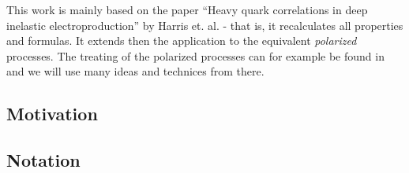 This work is mainly based on the paper \enquote{Heavy quark correlations in deep inelastic electroproduction} by Harris et. al.\cite{Harris:1995tu} - that is, it recalculates all properties and formulas. It extends then the application to the equivalent \textit{polarized} processes. The treating of the polarized processes can for example be found in \cite{Bojak:2000eu} and we will use many ideas and technices from there.

\subsection{Motivation}

\subsection{Notation}

